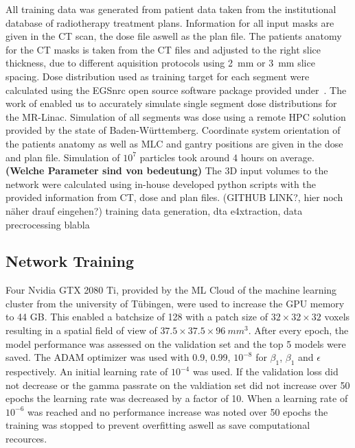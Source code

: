 All training data was generated from patient data taken from the institutional database of radiotherapy treatment plans. 
Information for all input masks are given in the CT scan, the dose file aswell as the plan file. 
The patients anatomy for the CT masks is taken from the CT files and adjusted to the right slice thickness, due to different aquisition protocols using 2~mm or 3~mm slice spacing. 
Dose distribution used as training target for each segment were calculated using the EGSnrc open source software package provided under~\cite{noauthor_nrc-cnrcegsnrc_2021}. 
The work of \citeauthor{friedel_development_2019} enabled us to accurately simulate single segment dose distributions for the MR-Linac. 
Simulation of all segments was dose using a remote \ac{HPC} solution provided by the state of Baden-Württemberg. 
Coordinate system orientation of the patients anatomy as well as \ac{MLC} and gantry positions are given in the dose and plan file. 
Simulation of $10^7$ particles took around 4 hours on average. \textbf{(Welche Parameter sind von bedeutung)}
The 3D input volumes to the network were calculated using in-house developed python scripts with the provided information from CT, dose and plan files. 
(GITHUB LINK?, hier noch näher drauf eingehen?) training data generation, dta e4xtraction, data precrocessing blabla 

\subsection{Network Training}

Four Nvidia GTX 2080 Ti, provided by the ML Cloud of the machine learning cluster from the university of Tübingen, were used to increase the \acs{GPU} memory to 44 GB. 
This enabled a batchsize of 128 with a patch size of $32 \times 32 \times 32$ voxels resulting in a spatial field of view of $37.5 \times 37.5 \times 96~mm^3$. 
After every epoch, the model performance was assessed on the validation set and the top 5 models were saved. 
The ADAM optimizer was used with 0.9, 0.99, $10^{-8}$ for $\beta_1$, $\beta_1$ and $\epsilon$ respectively. 
An initial learning rate of $10^{-4}$ was used. If the validation loss did not decrease or the gamma passrate on the valdiation set did not increase over 50 epochs the learning rate was decreased by a factor of 10. 
When a learning rate of $10^{-6}$ was reached and no performance increase was noted over 50 epochs the training was stopped to prevent overfitting aswell as save computational recources.
 

